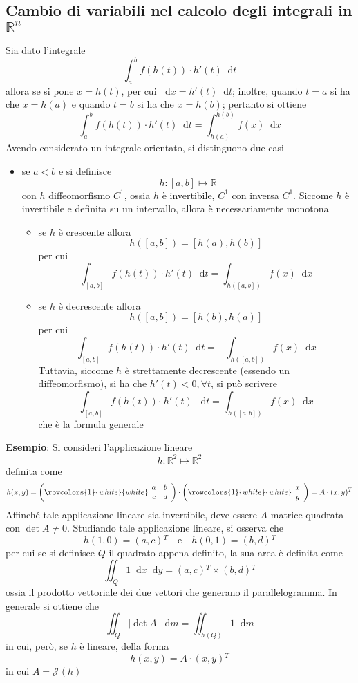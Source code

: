 \documentclass[a4paper]{extarticle}
\newcommand*\dif{\mathop{}\!\mathrm{d}}
\begin{document}
\subsection{Cambio di variabili nel calcolo degli integrali in $\mathbb{R}^n$}
Sia dato l'integrale
\[\int_a^b f(h(t)) \cdot h'(t) \dif t\]
allora se si pone $x=h(t)$, per cui $\dif x = h'(t) \dif t$; inoltre, quando $t=a$ si ha che $x=h(a)$ e quando $t=b$ si ha che $x=h(b)$; pertanto si ottiene
\[\int_a^b f(h(t)) \cdot h'(t) \dif t = \int_{h(a)}^{h(b)} f(x) \dif x\]
Avendo considerato un integrale orientato, si distinguono due casi
\begin{itemize}
    \item se $a < b$ e si definisce
    \[h : [a,b] \longmapsto \mathbb{R}\]
    con $h$ diffeomorfismo $C^1$, ossia $h$ è invertibile, $C^1$ con inversa $C^1$. Siccome $h$ è invertibile e definita su un intervallo, allora è necessariamente monotona
    \begin{itemize}
        \item se $h$ è crescente allora
        \[h([a,b]) = [h(a),h(b)]\]
        per cui
        \[\int_{[a,b]} f(h(t)) \cdot h'(t) \dif t = \int_{h([a,b])} f(x) \dif x\]
        \item se $h$ è decrescente allora
        \[h([a,b]) = [h(b),h(a)]\]
        per cui
        \[\int_{[a,b]} f(h(t)) \cdot h'(t) \dif t = -\int_{h([a,b])} f(x) \dif x\]
        Tuttavia, siccome $h$ è strettamente decrescente (essendo un diffeomorfismo), si ha che $h'(t) < 0, \forall t$, si può scrivere
        \[\int_{[a,b]} f(h(t)) \cdot \vert h'(t) \vert \dif t = \int_{h([a,b])} f(x) \dif x\]
        che è la formula generale
    \end{itemize} 
\end{itemize}

\vspace{2em}
\noindent
\textbf{Esempio}: Si consideri l'applicazione lineare
\[h : \mathbb{R}^2 \longmapsto \mathbb{R}^2\]
definita come
\[h(x,y) = \left(\rowcolors{1}{white}{white}
    \begin{array}{cc}
       a & b\\
       c & d\\ 
    \end{array}
\right) \cdot \left(\rowcolors{1}{white}{white}
\begin{array}{cc}
   x\\
   y\\ 
\end{array}
\right) = A \cdot (x,y){^T}\]
Affinché tale applicazione lineare sia invertibile, deve essere $A$ matrice quadrata con $\det A \neq 0$. Studiando tale applicazione lineare, si osserva che
\[h(1,0)=(a,c){^T} \hspace{1em} \text{e} \hspace{1em} h(0,1)=(b,d){^T}\]
per cui se si definisce $Q$ il quadrato appena definito, la sua area è definita come
\[\iint_Q 1 \dif x \dif y = (a,c){^T} \times (b,d){^T}\]
ossia il prodotto vettoriale dei due vettori che generano il parallelogramma. In generale si ottiene che
\[\iint_Q \left \vert \det A \right \vert \dif m = \iint_{h(Q)} 1 \dif m\]
in cui, però, se $h$ è lineare, della forma
\[h(x,y) = A \cdot (x,y){^T}\]
in cui $A=\mathcal{J}(h)$
\end{document}

